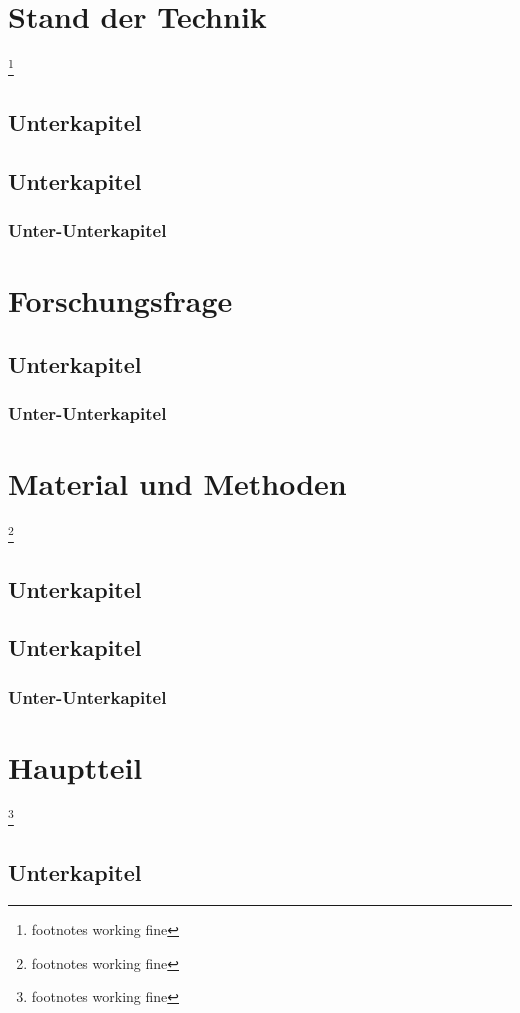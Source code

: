 \documentclass[12pt, a4paper, twoside, titlepage, showtrims]{scrbook} %
\begin{document}
\chapter{Stand der Technik}
\footnote{footnotes working fine}
\lipsum[3-11]
\section{Unterkapitel}
\lipsum[3-16]
\section{Unterkapitel}
\subsection{Unter-Unterkapitel}
\lipsum[3-5]

\chapter{Forschungsfrage}
\lipsum[3]
\section{Unterkapitel}
\lipsum[3]
\subsection{Unter-Unterkapitel}
\lipsum[3]

\chapter{Material und Methoden}
\footnote{footnotes working fine}
\lipsum[3-21]
\section{Unterkapitel}
\lipsum[3-21]
\section{Unterkapitel}
\subsection{Unter-Unterkapitel}

\chapter{Hauptteil}
\footnote{footnotes working fine}
\lipsum[3-21]
\section{Unterkapitel}
\lipsum[3-21]
\end{document}
